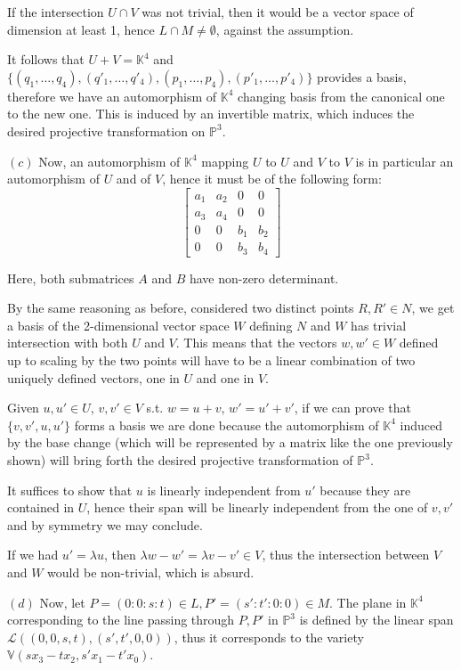 \documentclass{article}
\newcommand{\numberset}{\mathbb}
\newcommand{\K}{\numberset{K}}
\newcommand{\V}{\mathbb{V}}
\newcommand{\Ps}{\mathbb{P}}
\begin{document}
If the intersection $U\cap V$ was not trivial, then it would be a vector space of dimension at least 1, hence $L\cap M\neq\emptyset$, against the assumption.

It follows that $U+V=\K^4$ and $\{(q_1,\ldots,q_4),(q'_1,\ldots,q'_4),(p_1,\ldots,p_4),(p'_1,\ldots,p'_4)\}$ provides a basis, therefore we have an automorphism of $\K^4$ changing basis from the canonical one to the new one. This is induced by an invertible matrix, which induces the desired projective transformation on $\Ps^3$.

$(c)$ Now, an automorphism of $\K^4$ mapping $U$ to $U$ and $V$ to $V$ is in particular an automorphism of $U$ and of $V$, hence it must be of the following form:
$$
\begin{bmatrix}
		a_1 & a_2 & 0 & 0 \\
		a_3 & a_4 & 0 & 0 \\
		0 & 0 & b_1 & b_2 \\
		0 & 0 & b_3 & b_4
\end{bmatrix}
$$

Here, both submatrices $A$ and $B$ have non-zero determinant.

By the same reasoning as before, considered two distinct points $R,R'\in N$, we get a basis of the 2-dimensional vector space $W$ defining $N$ and $W$ has trivial intersection with both $U$ and $V$. This means that the vectors $w,w'\in W$ defined up to scaling by the two points will have to be a linear combination of two uniquely defined vectors, one in $U$ and one in $V$.

Given $u,u'\in U$, $v,v'\in V$ s.t. $w=u+v$, $w'=u'+v'$, if we can prove that $\{v,v',u,u'\}$ forms a basis we are done because the automorphism of $\K^4$ induced by the base change (which will be represented by a matrix like the one previously shown) will bring forth the desired projective transformation of $\Ps^3$.

It suffices to show that $u$ is linearly independent from $u'$ because they are contained in $U$, hence their span will be linearly independent from the one of $v,v'$ and by symmetry we may conclude.

If we had $u'=\lambda u$, then $\lambda w-w'=\lambda v-v'\in V$, thus the intersection between $V$ and $W$ would be non-trivial, which is absurd.

$(d)$ Now, let $P=(0:0:s:t)\in L,P'=(s':t':0:0)\in M$. The plane in $\K^4$ corresponding to the line passing through $P,P'$ in $\Ps^3$ is defined by the linear span $\mathcal{L}((0,0,s,t),(s',t',0,0))$, thus it corresponds to the variety $\V(sx_3-tx_2,s'x_1-t'x_0)$.
\end{document}
